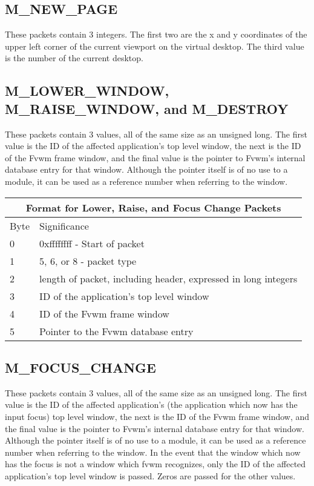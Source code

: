 \subsection{M\_NEW\_PAGE}
These packets contain 3 integers. The first two are the x and y
coordinates of the upper left corner of the current viewport on the
virtual desktop. The third value is the number of the current desktop.

\subsection{M\_LOWER\_WINDOW, M\_RAISE\_WINDOW, and M\_DESTROY}
These packets contain 3 values, all of the same size as an unsigned
long. The first value is the ID of the affected application's top level
window, the next is the ID of the Fvwm frame window, and the final
value is the pointer to Fvwm's internal database entry for that
window. Although the pointer itself is of no use to a module, it can
be used as a reference number when referring to the window.

\begin{table}
\begin{center}
\begin{tabular}[h]{|l|l|} \hline
\multicolumn{2}{|c|}{Format for Lower, Raise, and Focus Change Packets} \\ \hline
Byte &Significance \\\hline
0    & 0xffffffff - Start of packet \\
1    & 5, 6, or 8 - packet type \\
2    & length of packet, including header, expressed in long integers
\\ \hline
3    & ID of the application's top level window \\
4    & ID of the Fvwm frame window \\
5    & Pointer to the Fvwm database entry \\ \hline
\end{tabular}
\end{center}
\end{table}


\subsection{M\_FOCUS\_CHANGE}
These packets contain 3 values, all of the same size as an unsigned
long. The first value is the ID of the affected application's (the
application which now has the input focus) top level
window, the next is the ID of the Fvwm frame window, and the final
value is the pointer to Fvwm's internal database entry for that
window. Although the pointer itself is of no use to a module, it can
be used as a reference number when referring to the window. In the
event that the window which now has the focus is not a window which
fvwm recognizes, only the ID of the affected application's top level
window is passed. Zeros are passed for the other values.

